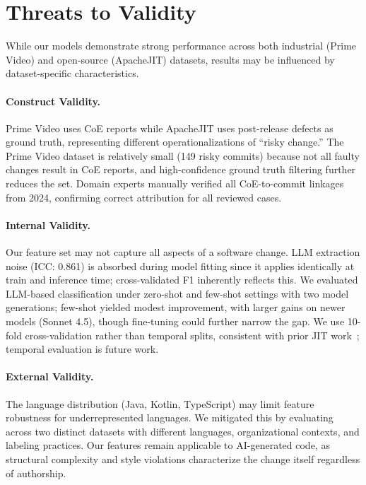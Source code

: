 \section{Threats to Validity}

While our models demonstrate strong performance across both industrial (Prime Video) and open-source (ApacheJIT) datasets, results may be influenced by dataset-specific characteristics.

\paragraph{Construct Validity.} Prime Video uses CoE reports while ApacheJIT uses post-release defects as ground truth, representing different operationalizations of ``risky change.'' The Prime Video dataset is relatively small (149 risky commits) because not all faulty changes result in CoE reports, and high-confidence ground truth filtering further reduces the set. Domain experts manually verified all CoE-to-commit linkages from 2024, confirming correct attribution for all reviewed cases.

\paragraph{Internal Validity.} Our feature set may not capture all aspects of a software change. LLM extraction noise (ICC: 0.861) is absorbed during model fitting since it applies identically at train and inference time; cross-validated F1 inherently reflects this. We evaluated LLM-based classification under zero-shot and few-shot settings with two model generations; few-shot yielded modest improvement, with larger gains on newer models (Sonnet 4.5), though fine-tuning could further narrow the gap. We use 10-fold cross-validation rather than temporal splits, consistent with prior JIT work~\cite{kamei2012large,pascarella2019fine}; temporal evaluation is future work.

\paragraph{External Validity.} The language distribution (Java, Kotlin, TypeScript) may limit feature robustness for underrepresented languages. We mitigated this by evaluating across two distinct datasets with different languages, organizational contexts, and labeling practices. Our features remain applicable to AI-generated code, as structural complexity and style violations characterize the change itself regardless of authorship.
